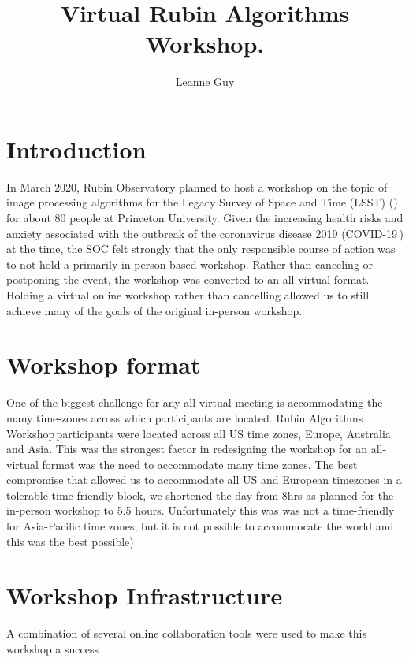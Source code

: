 \documentclass[DM,authoryear,toc]{lsstdoc}
\title[Virtual Rubin Algorithms Workshop]{Virtual Rubin Algorithms Workshop.}
\author{%
Leanne Guy
}
\date{\vcsDate}
\newcommand{\cvd}{COVID-19\,}
\newcommand{\raw}{Rubin Algorithms Workshop\,}
\begin{document}
\maketitle

\section{Introduction} 

In March 2020, Rubin Observatory planned to host a workshop on the topic of image processing algorithms for the Legacy Survey of Space and Time (LSST) (\cite{RAW2020}) for about 80 people at Princeton University.  
Given the increasing health risks and anxiety associated with the outbreak of the coronavirus disease 2019 (\cvd) at the time, the SOC felt strongly that the only responsible course of action was to not hold a primarily in-person based workshop. 
Rather than canceling or postponing the event, the workshop was converted to an all-virtual format. Holding a virtual online workshop rather than cancelling allowed us to still achieve many of the goals of the  original in-person workshop.

\section{Workshop format} 
One of the biggest challenge for any all-virtual meeting is accommodating the many time-zones across which participants are located.
\raw participants were located across all US time zones, Europe, Australia and Asia.  
This was the  strongest factor in redesigning the workshop for an all-virtual format was the need to accommodate many time zones. 
The best compromise that allowed us to accommodate all US and European timezones in a tolerable time-friendly block,  we shortened the day from 8hrs as planned for the in-person workshop to 5.5 hours.  Unfortunately this was was not a time-friendly for Asia-Pacific time zones, but it is not possible to accommocate the world and this was the best possible)

\section{Workshop Infrastructure} 
A combination of several online collaboration tools were used to make this workshop a success
\end{document}
